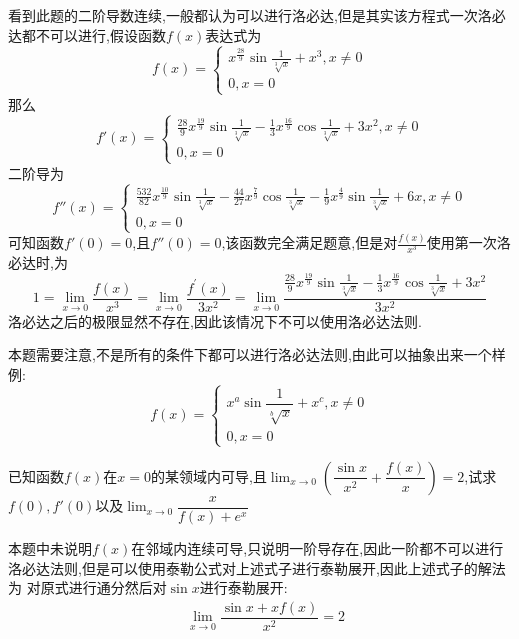 \documentclass[9pt a4paper, oneside, UTF8]{ctexbook}
\begin{document}
\begin{sloppypar}
\begin{solution}
        看到此题的二阶导数连续,一般都认为可以进行洛必达,但是其实该方程式一次洛必达都不可以进行,假设函数$f(x)$表达式为$$f\left(x\right)=\begin{cases}x^{\frac{28}{9}}\sin\frac{1}{\sqrt[3]{x}}+x^3,x\neq0\\0,x=0\end{cases}$$那么$$f'\left(x\right)=\begin{cases}\frac{28}{9}x^{\frac{19}{9}}\sin\frac{1}{\sqrt[3]{x}}-\frac{1}{3}x^{\frac{16}{9}}\cos\frac{1}{\sqrt[3]{x}}+{3x^{2}},x\neq0\\0,x=0\end{cases}$$二阶导为$$f''(x)=\begin{cases}\frac{532}{82}x^{\frac{10}{9}}\sin\frac{1}{\sqrt[3]{x}}-\frac{44}{27}x^{\frac{7}{9}}\cos\frac{1}{\sqrt[3]{x}}-\frac{1}{9}x^{\frac{4}{9}}\sin\frac{1}{\sqrt[3]{x}}+6x,x\neq0\\0,x=0\end{cases}$$可知函数$f'(0)=0$,且$f''(0)=0$,该函数完全满足题意,但是对$\frac{f(x)}{x^3}$使用第一次洛必达时,为$$1=\lim_{x\to0}\frac{f\left(x\right)}{x^{3}}=\lim_{x\to0}\frac{f^{\prime}\left(x\right)}{3x^{2}}=\lim_{x\to0}\frac{\frac{28}9x^{\frac{19}9}\sin\frac1{\sqrt[3]{x}}-\frac13x^{\frac{16}9}\cos\frac1{\sqrt[3]{x}}+3x^2}{3x^{2}}$$洛必达之后的极限显然不存在,因此该情况下不可以使用洛必达法则.
    \end{solution}
    \begin{note}
        本题需要注意,不是所有的条件下都可以进行洛必达法则,由此可以抽象出来一个样例:
        $$f\left(x\right)=\begin{cases}x^a\sin\dfrac{1}{\sqrt[b]{x}}+x^c,x\neq0\\0,x=0\end{cases}$$
    \end{note}
    \begin{problem}
        已知函数$f(x)$在$x=0$的某领域内可导,且$\lim_{x \to 0}(\dfrac{\sin x}{x^2}+\dfrac{f(x)}{x})=2$,试求$f(0),f'(0)$以及$\lim_{x\to0}\dfrac{x}{f(x)+e^x}$
    \end{problem}
    \begin{solution}
        本题中未说明$f(x)$在邻域内连续可导,只说明一阶导存在,因此一阶都不可以进行洛必达法则,但是可以使用泰勒公式对上述式子进行泰勒展开,因此上述式子的解法为
        对原式进行通分然后对$\sin x$进行泰勒展开:
        \begin{equation*}
            \begin{split}    
                & \lim_{x \to 0}\dfrac{\sin x+xf(x)}{x^2}=2\\

\end{split}
\end{equation*}
\end{solution}
\end{sloppypar}
\end{document}
